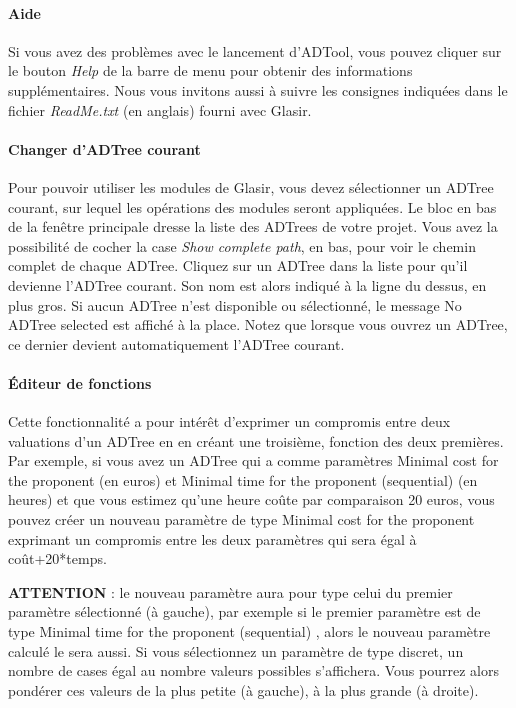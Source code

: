 \paragraph{Aide} Si vous avez des problèmes avec le lancement d'ADTool, vous pouvez cliquer sur le bouton \emph{Help} de la barre de menu pour obtenir des informations supplémentaires. Nous vous invitons aussi à suivre les consignes indiquées dans le fichier \emph{ReadMe.txt} (en anglais) fourni avec Glasir.

\paragraph{Changer d'ADTree courant} Pour pouvoir utiliser les modules de Glasir, vous devez sélectionner un ADTree courant, sur lequel les opérations des modules seront appliquées. Le bloc en bas de la fenêtre principale dresse la liste des ADTrees de votre projet.  Vous avez la possibilité de cocher la case \emph{Show complete path}, en bas, pour voir le chemin complet de chaque ADTree. Cliquez sur un ADTree dans la liste pour qu'il devienne l'ADTree courant. Son nom est alors indiqué à la ligne du dessus, en plus gros. Si aucun ADTree n'est disponible ou sélectionné, le message \og No ADTree selected \fg{} est affiché à la place. Notez que lorsque vous ouvrez un ADTree, ce dernier devient automatiquement l'ADTree courant.

\paragraph{Éditeur de fonctions} Cette fonctionnalité a pour intérêt d'exprimer un compromis entre deux valuations d'un ADTree en en créant une troisième, fonction des deux premières. Par exemple, si vous avez un ADTree qui a comme paramètres \og Minimal cost for the proponent \fg (en euros) et \og Minimal time for the proponent (sequential) \fg (en heures) et que vous estimez qu'une heure \og coûte \fg par comparaison 20 euros, vous pouvez créer un nouveau paramètre de type \og Minimal cost for the proponent \fg exprimant un compromis entre les deux paramètres qui sera égal à coût+20*temps.

\textbf{ATTENTION} : le nouveau paramètre aura pour type celui du premier paramètre sélectionné (à gauche), par exemple si le premier paramètre est de type \og Minimal time for the proponent (sequential) \fg , alors le nouveau paramètre calculé le sera aussi. Si vous sélectionnez un paramètre de type discret, un nombre de cases égal au nombre valeurs possibles s'affichera. Vous pourrez alors pondérer ces valeurs de la plus petite (à gauche), à la plus grande (à droite).

